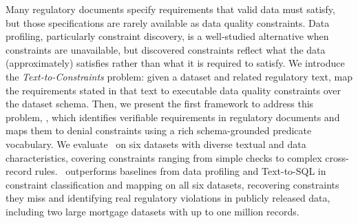 Many regulatory documents specify requirements that valid data must satisfy, but those specifications are rarely available as data quality constraints. 
Data profiling, particularly constraint discovery, is a well-studied alternative when constraints are unavailable, but discovered constraints reflect what the data (approximately) satisfies rather than what it is required to satisfy.
We introduce the \emph{Text-to-Constraints} problem: given a dataset and related regulatory text, map the requirements stated in that text to executable data quality constraints over the dataset schema. 
Then, we present the first framework to address this problem, \system, which identifies verifiable requirements in regulatory documents and maps them to denial constraints using a rich schema-grounded predicate vocabulary. 
We evaluate \system\ on six datasets with diverse textual and data characteristics, covering constraints ranging from simple checks to complex cross-record rules. \system\ outperforms baselines from data profiling and Text-to-SQL in constraint classification and mapping on all six datasets, recovering constraints they miss and identifying real regulatory violations in publicly released data, including two large mortgage datasets with up to one million records.







